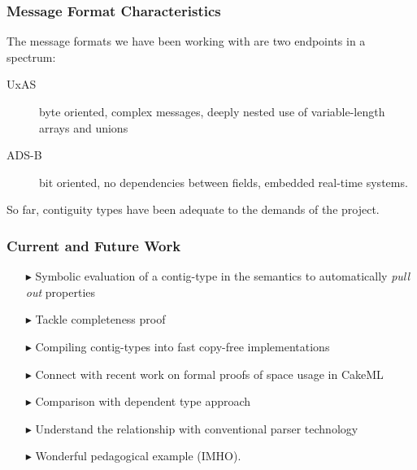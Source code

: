 \documentclass{beamer}
\begin{document}
\begin{frame}\frametitle{Message Format Characteristics}

The message formats we have been working with are two endpoints in a spectrum:


\begin{description}

\item [UxAS] byte oriented, complex messages, deeply nested use of
  variable-length arrays and unions

\item [ADS-B] bit oriented, no dependencies between fields, embedded real-time systems.

\end{description}

So far, contiguity types have been adequate to the demands of the project.

\end{frame}


\begin{frame}\frametitle{Current and  Future Work}

\begin{itemize}

\item [$\blacktriangleright$] Symbolic evaluation of a contig-type in
  the semantics to automatically \emph{pull out} properties

\item [$\blacktriangleright$] Tackle completeness proof

\item [$\blacktriangleright$] Compiling contig-types into fast copy-free implementations

\item [$\blacktriangleright$] Connect with recent work on formal proofs of space usage in CakeML

\item [$\blacktriangleright$] Comparison with dependent type approach

\item [$\blacktriangleright$] Understand the relationship with conventional parser technology

\item [$\blacktriangleright$] Wonderful pedagogical example (IMHO).

\end{itemize}

\end{frame}
\end{document}
